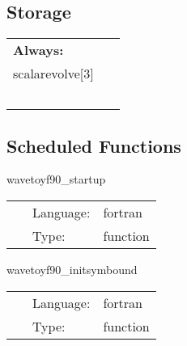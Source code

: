 \subsection*{Storage}

\hspace{5mm}

 \begin{tabular*}{160mm}{ll} 

{\bf Always:}&  ~ \\ 
 scalarevolve[3] & ~\\ 
~ & ~\\ 
\end{tabular*} 


\subsection*{Scheduled Functions}
\vspace{5mm}


\hspace{5mm} wavetoyf90\_startup 

\hspace{5mm}{\it register banner } 


\hspace{5mm}

 \begin{tabular*}{160mm}{cll} 
~ & Language:  & fortran \\ 
~ & Type:  & function \\ 
\end{tabular*} 


\vspace{5mm}


\hspace{5mm} wavetoyf90\_initsymbound 

\hspace{5mm}{\it schedule symmetries } 


\hspace{5mm}

 \begin{tabular*}{160mm}{cll} 
~ & Language:  & fortran \\ 
~ & Type:  & function \\ 
\end{tabular*} 


\vspace{5mm}


